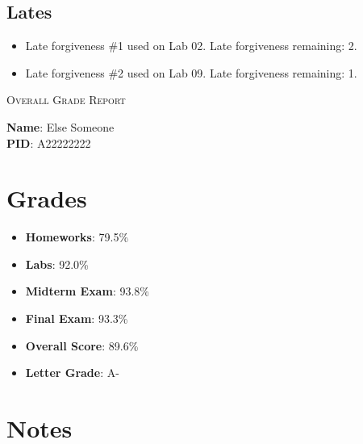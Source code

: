 \documentclass{article}
\begin{document}
\subsection*{Lates}

\begin{itemize}


\item Late forgiveness \#1 used on Lab 02. Late forgiveness remaining: 2.


\item Late forgiveness \#2 used on Lab 09. Late forgiveness remaining: 1.


\end{itemize}
\newpage

\begin{center}
    \textsc{Overall Grade Report}
\end{center}
\vspace{4em}


\textbf{Name}: Else Someone\\[2em]


\textbf{PID}: A22222222
\vspace{4em}

\section*{Grades}

\begin{itemize}


\item \textbf{Homeworks}: 79.5\%


\item \textbf{Labs}: 92.0\%


\item \textbf{Midterm Exam}: 93.8\%


\item \textbf{Final Exam}: 93.3\%


\end{itemize}

\begin{itemize}
    \item \textbf{Overall Score}: 89.6\%
    \item \textbf{Letter Grade}: A-


\end{itemize}

\section*{Notes}
\end{document}
